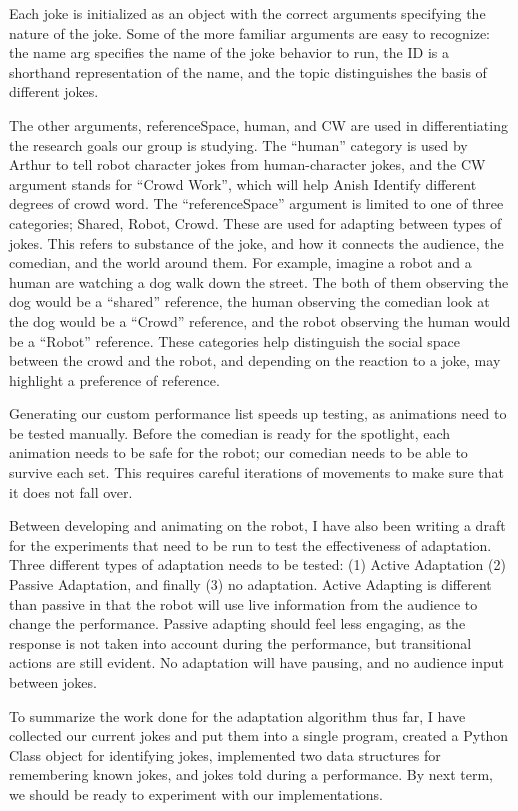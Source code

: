 \documentclass[onecolumn, draftclsnofoot,10pt, compsoc]{IEEEtran}
\begin{document}
Each joke is initialized as an object with the correct arguments specifying the nature of the joke. Some of the more familiar arguments are easy to recognize: the name arg specifies the name of the joke behavior to run, the ID is a shorthand representation of the name, and the topic distinguishes the basis of different jokes.

The other arguments, referenceSpace, human, and CW are used in differentiating the research goals our group is studying. The “human” category is used by Arthur to tell robot character jokes from human-character jokes, and the CW argument stands for “Crowd Work”, which will help Anish Identify different degrees of crowd word.
The “referenceSpace” argument is limited to one of three categories; Shared, Robot, Crowd. These are used for adapting between types of jokes. This refers to substance of the joke, and how it connects the audience, the comedian, and the world around them. For example, imagine a robot and a human are watching a dog walk down the street. The both of them observing the dog would be a “shared” reference, the human observing the comedian look at the dog would be a “Crowd” reference, and the robot observing the human would be a “Robot” reference. These categories help distinguish the social space between the crowd and the robot, and depending on the reaction to a joke, may highlight a preference of reference.


Generating our custom performance list speeds up testing, as animations need to be tested manually. Before the comedian is ready for the spotlight, each animation needs to be safe for the robot; our comedian needs to be able to survive each set. This requires careful iterations of movements to make sure that it does not fall over.

Between developing and animating on the robot, I have also been writing a draft for the experiments that need to be run to test the effectiveness of adaptation. Three different types of adaptation needs to be tested: (1) Active Adaptation (2) Passive Adaptation, and finally (3) no adaptation. Active Adapting is different than passive in that the robot will use live information from the audience to change the performance. Passive adapting should feel less engaging, as the response is not taken into account during the performance, but transitional actions are still evident. No adaptation will have pausing, and no audience input between jokes.

To summarize the work done for the adaptation algorithm thus far, I have collected our current jokes and put them into a single program, created a Python Class object for identifying jokes, implemented two data structures for remembering known jokes, and jokes told during a performance. By next term, we should be ready to experiment with our implementations.
\end{document}
